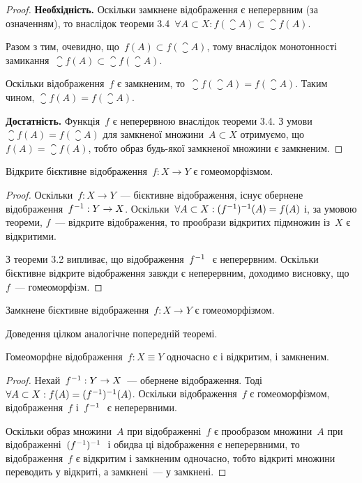 \begin{proof}
    \textbf{Необхідність.} Оскільки замкнене відображення є неперервним (за означенням), то внаслідок \error теореми 3.4~$\forall A \subset X: f(\closure{A}) \subset \closure{f(A)}$.

    Разом з тим, очевидно, що~$f(A) \subset f(\closure{A})$, тому внаслідок монотонності замикання~$\closure{f(A)} \subset \closure{f(\closure{A})}$.

    Оскільки відображення~$f$ є замкненим, то~$\closure{f(\closure{A})} = f(\closure{A})$. Таким чином, $\closure{f(A)} = f(\closure{A})$.

    \textbf{Достатність.} Функція~$f$ є неперервною внаслідок \error теореми 3.4. З умови~$\closure{f(A)} = f(\closure{A})$ для замкненої множини~$A \subset X$ отримуємо, що~$f(A) = \closure{f(A)}$, тобто образ будь-якої замкненої множини є замкненим.
\end{proof}

\begin{theorem}
    Відкрите бієктивне відображення~$f: X \to Y$ є гомеоморфізмом.
\end{theorem}

\begin{proof}
    Оскільки~$f: X \to Y$~--- бієктивне відображення, існує обернене відображення~$f^{-1} : Y \to X$. Оскільки~$\forall A \subset X: (f^{-1} )^{-1}(A) = f(A)$ і, за умовою теореми, $f$~--- відкрите відображення, то прообрази відкритих підмножин із~$X$ є відкритими.

    З \error теореми 3.2 випливає, що відображення~$f^{-1}~$ є неперервним. Оскільки бієктивне відкрите відображення завжди є неперервним, доходимо висновку, що~$f$~--- гомеоморфізм.
\end{proof}

\begin{theorem}
    Замкнене бієктивне відображення~$f: X \to Y$ є гомеоморфізмом.
\end{theorem}

Доведення цілком аналогічне попередній теоремі.

\begin{theorem}
    Гомеоморфне відображення~$f: X \equiv Y$ одночасно є і відкритим, і замкненим.
\end{theorem}

\begin{proof}
    Нехай~$f^{-1} : Y \to X$~--- обернене відображення. Тоді~$\forall A \subset X: f(A) = (f^{-1} )^{-1}(A)$. Оскільки відображення~$f$ є гомеоморфізмом, відображення~$f$ і~$f^{-1}~$ є неперервними.

    Оскільки образ множини~$A$ при відображенні~$f$ є прообразом множини~$A$ при відображенні~$(f^{-1} )^{-1}~$ і обидва ці відображення є неперервними, то відображення~$f$ є відкритим і замкненим одночасно, тобто відкриті множини переводить у відкриті, а замкнені~--- у замкнені.
\end{proof}

